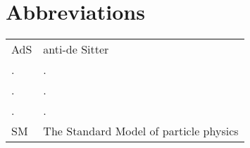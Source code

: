 
\chapter*{Abbreviations}

\markboth{}{}

\noindent \bgroup\def\arraystretch{1.2}%
\begin{longtable}[l]{ll}
  
AdS & anti-de Sitter \cite{Misner:1974qy}\tabularnewline
. & .\tabularnewline
. & .\tabularnewline
. & .\tabularnewline
SM & The Standard Model of particle physics\tabularnewline

\end{longtable}\egroup

